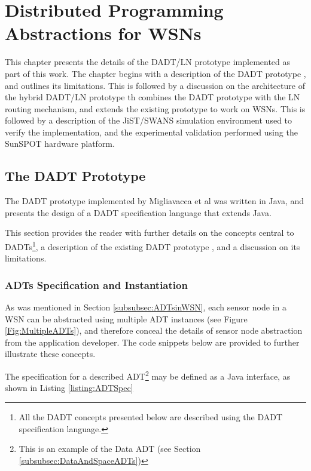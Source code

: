 \chapter{Distributed Programming Abstractions for WSNs} \label{chap:Implementation}
\label{chap:Implementation}

This chapter presents the details of the DADT/LN prototype implemented as part of this work. The chapter begins with a description of the DADT prototype \cite{migliavacca_DADT:2006}, and outlines its limitations. This is followed by a discussion on the architecture of the hybrid DADT/LN prototype th combines the DADT prototype with the LN routing mechanism, and extends the existing prototype to work on WSNs. This is followed by a description of the JiST/SWANS simulation environment used to verify the implementation, and the experimental validation performed using the SunSPOT hardware platform.

\section {The DADT Prototype}

The DADT prototype implemented by Migliavacca et al \cite{migliavacca_DADT:2006} was written in Java, and presents the design of a DADT specification language that extends Java.

This section provides the reader with
further details on the concepts central to DADTs\footnote{All the DADT concepts presented below
are described using the DADT specification language.}, a description of the
existing DADT prototype \cite{migliavacca_DADT:2006}, and a discussion on its limitations.

\subsection{ADTs Specification and Instantiation} \label{subsec:ADTSpecInst}

As was mentioned in Section \ref{subsubsec:ADTsinWSN}, each sensor node
in a WSN can be abstracted using multiple ADT instances (see
Figure \ref{Fig:MultipleADTs}), and therefore conceal the details of sensor
node abstraction from the application developer. The code snippets below are
provided to further illustrate these concepts.

The specification for a described ADT\footnote{This is an example of the Data ADT (see Section
\ref{subsubsec:DataAndSpaceADTs})} may be defined as a Java interface, as shown in Listing \ref{listing:ADTSpec}

